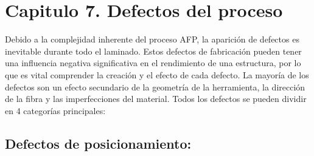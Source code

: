 \chapter{Capitulo 7. Defectos del proceso}
\label{capitulo 3}
Debido a la complejidad inherente del proceso AFP, la aparición de defectos es inevitable durante todo el laminado. Estos defectos de fabricación pueden tener una influencia negativa significativa en el rendimiento de una estructura, por lo que es vital comprender la creación y el efecto de cada defecto. La mayoría de los defectos son un efecto secundario de la geometría de la herramienta, la dirección de la fibra y las imperfecciones del material. Todos los defectos se pueden dividir en 4 categorías principales: 

\section{Defectos de posicionamiento:}

